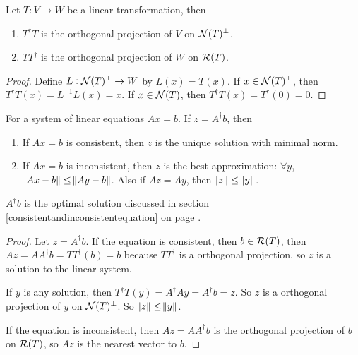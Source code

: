 \begin{theorem}
    Let $T: V \rightarrow W$ be a linear transformation, then
    \begin{enumerate}
        \item $T^\dag T$ is the orthogonal projection of $V$ on $\mathcal{N}(T)^\bot$.
        \item $TT^\dag$ is the orthogonal projection of $W$ on $\mathcal{R}(T)$.
    \end{enumerate}    
\end{theorem}
\begin{proof}
    Define $L: \mathcal{N}(T)^\bot \rightarrow W$ by $L(x) = T(x)$. If $x \in \mathcal{N}(T)^\bot$, then $T^\dag T (x) = L^{-1} L (x) = x$. If $x \in \mathcal{N}(T)$, then $T^\dag T (x) = T^\dag (0) = 0$.
\end{proof}


\begin{theorem}
    For a system of linear equations $Ax = b$. If $z = A^\dag b$, then
    \begin{enumerate}
        \item If $Ax=b$ is consistent, then $z$ is the unique solution with minimal norm.
        \item If $Ax=b$ is inconsistent, then $z$ is the best approximation: $\forall y$, $\norm{Ax-b} \leq \norm{Ay-b}$. Also if $Az = Ay$, then $\norm{z} \leq \norm{y}$.
    \end{enumerate}
    
    $A^\dag b$ is the optimal solution discussed in section \ref{consistentandinconsistentequation} on page \pageref{consistentandinconsistentequation}.
\end{theorem}
\begin{proof}
    Let $z = A^\dag b$. If the equation is consistent, then $b \in \mathcal{R}(T)$, then $Az = AA^\dag b = TT^\dag (b) = b$ because $TT^\dag$ is a orthogonal projection, so $z$ is a solution to the linear system.
    
    If $y$ is any solution, then $T^\dag T (y) = A^\dag A y = A^\dag b = z$. So $z$ is a orthogonal projection of $y$ on $\mathcal{N}(T)^\bot$. So $\norm{z} \leq \norm{y}$.
    
    If the equation is inconsistent, then $Az = AA^\dag b$ is the orthogonal projection of $b$ on $\mathcal{R}(T)$, so $Az$ is the nearest vector to $b$.
\end{proof}





